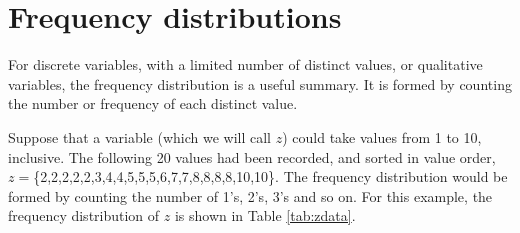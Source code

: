 \documentclass[
  oneside]{krantz}
\begin{document}
\hypertarget{frequency-distributions}{%
\section{Frequency distributions}\label{frequency-distributions}}

For discrete variables, with a limited number of distinct values, or qualitative variables, the frequency distribution is a useful summary. It is formed by counting the number or frequency of each distinct value.

Suppose that a variable (which we will call \(z\)) could take values from 1 to 10, inclusive. The following 20 values had been recorded, and sorted in value order, \(z=\)\{2,2,2,2,2,3,4,4,5,5,5,6,7,7,8,8,8,8,10,10\}. The frequency distribution would be formed by counting the number of 1's, 2's, 3's and so on. For this example, the frequency distribution of \(z\) is shown in Table \ref{tab:zdata}.
\end{document}
